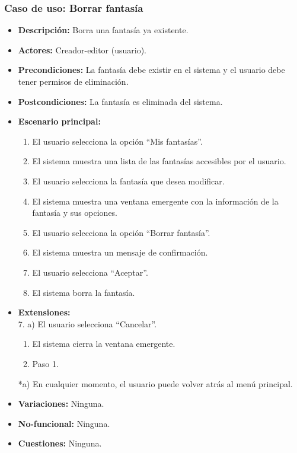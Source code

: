 \subsubsection{Caso de uso: Borrar fantasía}
\begin{itemize}
	\item \textbf{Descripción:} Borra una fantasía ya existente.
	\item \textbf{Actores:} Creador-editor (usuario).
	\item \textbf{Precondiciones:} La fantasía debe existir en el sistema y el usuario debe tener permisos de eliminación.
	\item \textbf{Postcondiciones:} La fantasía es eliminada del sistema.
	\item \textbf{Escenario principal:}
	\begin{enumerate}
		\item El usuario selecciona la opción ``Mis fantasías''.
		\item El sistema muestra una lista de las fantasías accesibles por el usuario.
		\item El usuario selecciona la fantasía que desea modificar.
		\item El sistema muestra una ventana emergente con la información de la fantasía y sus opciones.
		\item El usuario selecciona la opción ``Borrar fantasía''.
		\item El sistema muestra un mensaje de confirmación.
		\item El usuario selecciona ``Aceptar''.
		\item El sistema borra la fantasía.
	\end{enumerate}
	\item \textbf{Extensiones:}  \\7. a) El usuario selecciona ``Cancelar''.
	\begin{enumerate}
		\item El sistema cierra la ventana emergente.
		\item Paso 1.
	\end{enumerate}
	*a) En cualquier momento, el usuario puede volver atrás al menú principal.
	\item \textbf{Variaciones:} Ninguna.
	\item \textbf{No-funcional:} Ninguna.
	\item \textbf{Cuestiones:} Ninguna.
\end{itemize}


